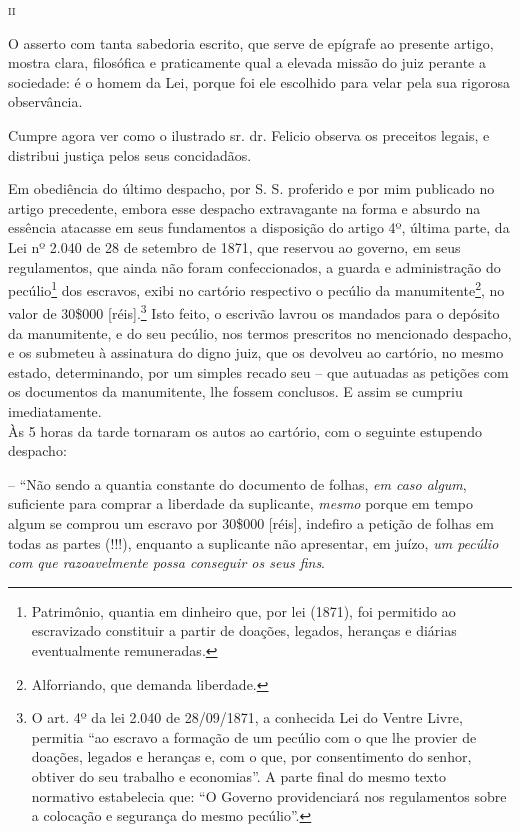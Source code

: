 \textsc{ii}

O asserto com tanta sabedoria escrito, que serve de epígrafe ao presente
artigo, mostra clara, filosófica e praticamente qual a elevada missão do
juiz perante a sociedade: é o homem da Lei, porque foi ele escolhido
para velar pela sua rigorosa observância.

Cumpre agora ver como o ilustrado sr. dr. Felicio observa os preceitos
legais, e distribui justiça pelos seus concidadãos.

Em obediência do último despacho, por S. S. proferido e por mim
publicado no artigo precedente, embora esse despacho extravagante na
forma e absurdo na essência atacasse em seus fundamentos a disposição do
artigo 4º, última parte, da Lei nº 2.040 de 28 de setembro de 1871, que 
reservou ao governo, em seus regulamentos, que ainda não foram
confeccionados, a guarda e administração do pecúlio\footnote{
  Patrimônio, quantia em dinheiro que, por lei (1871), foi permitido ao
  escravizado constituir a partir de doações, legados, heranças e
  diárias eventualmente remuneradas.} dos escravos, exibi no cartório
respectivo o pecúlio da manumitente\footnote{ Alforriando, que demanda
  liberdade.}, no valor de 30\$000 {[}réis{]}.\footnote{ O art. 4º da
  lei 2.040 de 28/09/1871, a conhecida Lei do Ventre Livre, permitia ``ao
  escravo a formação de um pecúlio com o que lhe provier de doações,
  legados e heranças e, com o que, por consentimento do senhor, obtiver
  do seu trabalho e economias''. A parte final do mesmo texto normativo
  estabelecia que: ``O Governo providenciará nos regulamentos sobre a
  colocação e segurança do mesmo pecúlio''.} Isto feito, o escrivão
lavrou os mandados para o depósito da manumitente, e do seu pecúlio, nos
termos prescritos no mencionado despacho, e os submeteu à assinatura do
digno juiz, que os devolveu ao cartório, no mesmo estado, determinando,
por um simples recado seu -- que autuadas as petições com os documentos
da manumitente, lhe fossem conclusos. E assim se cumpriu
imediatamente.\\
Às 5 horas da tarde tornaram os autos ao cartório, com o seguinte
estupendo despacho:

-- ``Não sendo a quantia constante do documento de folhas, \emph{em caso
algum}, suficiente para comprar a liberdade da suplicante, \emph{mesmo}
porque em tempo algum se comprou um escravo por 30\$000 {[}réis{]},
indefiro a petição de folhas em todas as partes (!!!), enquanto a
suplicante não apresentar, em juízo, \emph{um pecúlio com que
razoavelmente possa conseguir os seus fins}.

